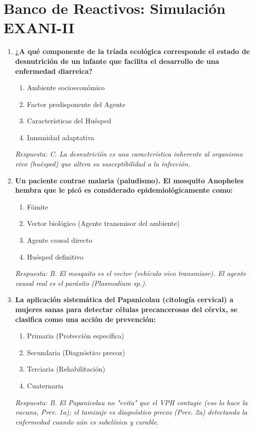 \documentclass[spanish,letterpaper,oneside]{article}
\begin{document}
\section{Banco de Reactivos: Simulación EXANI-II}
\begin{enumerate}[label=\textbf{\arabic*.}]
    \item \textbf{¿A qué componente de la tríada ecológica corresponde el estado de desnutrición de un infante que facilita el desarrollo de una enfermedad diarreica?}
    \begin{enumerate}
        \item[A)] Ambiente socioeconómico
        \item[B)] Factor predisponente del Agente
        \item[C)] Características del Huésped
        \item[D)] Inmunidad adaptativa
    \end{enumerate}
    \textit{Respuesta: C. La desnutrición es una característica inherente al organismo vivo (huésped) que altera su susceptibilidad a la infección.}

    \item \textbf{Un paciente contrae malaria (paludismo). El mosquito Anopheles hembra que le picó es considerado epidemiológicamente como:}
    \begin{enumerate}
        \item[A)] Fómite
        \item[B)] Vector biológico (Agente transmisor del ambiente)
        \item[C)] Agente causal directo
        \item[D)] Huésped definitivo
    \end{enumerate}
    \textit{Respuesta: B. El mosquito es el vector (vehículo vivo transmisor). El agente causal real es el parásito (Plasmodium sp.).}

    \item \textbf{La aplicación sistemática del Papanicolau (citología cervical) a mujeres sanas para detectar células precancerosas del cérvix, se clasifica como una acción de prevención:}
    \begin{enumerate}
        \item[A)] Primaria (Protección específica)
        \item[B)] Secundaria (Diagnóstico precoz)
        \item[C)] Terciaria (Rehabilitación)
        \item[D)] Cuaternaria
    \end{enumerate}
    \textit{Respuesta: B. El Papanicolau no "evita" que el VPH contagie (eso lo hace la vacuna, Prev. 1a); el tamizaje es diagnóstico precoz (Prev. 2a) detectando la enfermedad cuando aún es subclínica y curable.}


\end{enumerate}
\end{document}
